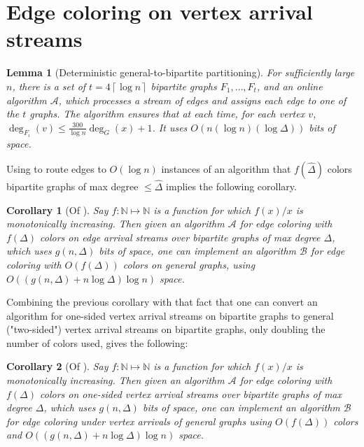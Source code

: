 \documentclass[10pt]{article}
\newtheorem{lemma}[theorem]{Lemma}
\newtheorem{corollary}[lemma]{Corollary}
\theoremstyle{definition}\newtheorem{definition}[lemma]{Definition}
\theoremstyle{remark}  \newtheorem*{remark}{Remark}
\newcommand{\NN}{\mathbb{N}}
\newcommand{\cA}{\mathcal{A}}
\newcommand{\cB}{\mathcal{B}}
\newcommand{\ceil}[1]{{\left\lceil{#1}\right\rceil}}
\begin{document}
\section{Edge coloring on vertex arrival streams}


\begin{lemma}[Deterministic general-to-bipartite partitioning]\label{lem:edge-gen-to-bpt}
   For sufficiently large $n$, there is a set of $t = 4 \ceil{\log n}$ bipartite graphs $F_1,\ldots,F_t$, and an online algorithm $\cA$, which processes a stream of edges and assigns each edge to one of the $t$ graphs. The algorithm ensures that at each time, for each vertex $v$, $\deg_{F_i}(v) \le \frac{300}{\log n} \deg_G(x) + 1$. It uses $O(n (\log n) (\log \Delta))$ bits of space.
\end{lemma}

Using  to route edges to $O(\log n)$ instances of an algorithm that
$f(\hat{\Delta})$ colors bipartite graphs of max degree $\le \hat{\Delta}$ implies the following corollary.

\begin{corollary}[Of ]\label{lem:cvt-gen-to-bpt-ea}
  Say $f : \NN \mapsto \NN$ is a function for which $f(x) / x$ is monotonically
  increasing. Then given an algorithm $\cA$ for edge coloring with $f(\Delta)$
  colors on edge arrival streams over bipartite graphs of max degree $\Delta$,
  which uses $g(n,\Delta)$ bits of space, one can implement an algorithm
  $\cB$ for edge coloring with $O(f(\Delta))$ colors on general graphs,
  using $O((g(n,\Delta) + n \log \Delta) \log n)$ space.
\end{corollary}

Combining the previous corollary with that fact that one can convert an algorithm for one-sided vertex arrival streams on bipartite graphs to general ("two-sided") vertex arrival streams on bipartite graphs, only doubling the number of colors used, gives the following:

\begin{corollary}[Of ]\label{lem:cvt-gen-to-bpt}
  Say $f : \NN \mapsto \NN$ is a function for which $f(x) / x$ is monotonically
  increasing. Then given an algorithm $\cA$ for edge coloring with $f(\Delta)$ 
  colors on one-sided vertex arrival streams over bipartite graphs of max degree
  $\Delta$, which uses $g(n,\Delta)$ bits of space,
  one can implement an algorithm $\cB$ for edge coloring under vertex arrivals of general graphs using 
  $O(f(\Delta))$ colors and $O((g(n,\Delta) + n \log \Delta) \log n)$ space.
\end{corollary}
\end{document}
